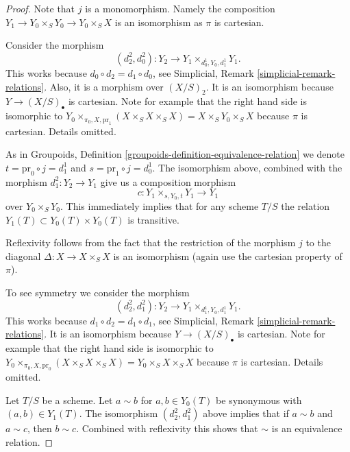 \begin{proof}
Note that $j$ is a monomorphism. Namely the
composition $Y_1 \to Y_0 \times_S Y_0 \to Y_0 \times_S X$
is an isomorphism as $\pi$ is cartesian.

\medskip\noindent
Consider the morphism
$$
(d^2_2, d^2_0) : Y_2 \to Y_1 \times_{d^1_0, Y_0, d^1_1} Y_1.
$$
This works because $d_0 \circ d_2 = d_1 \circ d_0$,
see Simplicial, Remark \ref{simplicial-remark-relations}.
Also, it is a morphism over $(X/S)_2$. It is an isomorphism
because $Y \to (X/S)_\bullet$ is cartesian. Note for example that the
right hand side is isomorphic to
$Y_0 \times_{\pi_0, X, \text{pr}_1} (X \times_S X \times_S X) =
X \times_S Y_0 \times_S X$
because $\pi$ is cartesian. Details omitted.

\medskip\noindent
As in Groupoids, Definition \ref{groupoids-definition-equivalence-relation}
we denote $t = \text{pr}_0 \circ j = d^1_1$ and
$s = \text{pr}_1 \circ j = d^1_0$.
The isomorphism above, combined with the morphism
$d^2_1 : Y_2 \to Y_1$ give us a composition morphism
$$
c : Y_1 \times_{s, Y_0, t} Y_1 \longrightarrow Y_1
$$
over $Y_0 \times_S Y_0$. This immediately implies
that for any scheme $T/S$ the relation
$Y_1(T) \subset Y_0(T) \times Y_0(T)$ is transitive.

\medskip\noindent
Reflexivity follows from the fact that the
restriction of the morphism $j$ to the diagonal
$\Delta : X \to X \times_S X$ is an isomorphism
(again use the cartesian property of $\pi$).

\medskip\noindent
To see symmetry we consider the morphism
$$
(d^2_2, d^2_1) : Y_2 \to Y_1 \times_{d^1_1, Y_0, d^1_1} Y_1.
$$
This works because $d_1 \circ d_2 = d_1 \circ d_1$,
see Simplicial, Remark \ref{simplicial-remark-relations}.
It is an isomorphism
because $Y \to (X/S)_\bullet$ is cartesian.
Note for example that the
right hand side is isomorphic to
$Y_0 \times_{\pi_0, X, \text{pr}_0} (X \times_S X \times_S X) =
Y_0 \times_S X \times_S X$
because $\pi$ is cartesian. Details omitted.

\medskip\noindent
Let $T/S$ be a scheme. Let $a \sim b$ for $a, b \in Y_0(T)$
be synonymous with $(a, b) \in Y_1(T)$.
The isomorphism $(d^2_2, d^2_1)$ above
implies that if $a \sim b$ and $a \sim c$, then $b \sim c$.
Combined with reflexivity this shows that $\sim$ is
an equivalence relation.
\end{proof}







